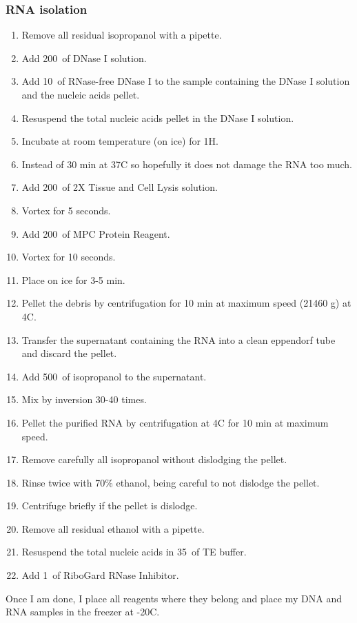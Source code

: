 \subsubsection{RNA isolation}

\begin{enumerate}
\item Remove all residual isopropanol with a pipette.
\item Add 200~\uL of DNase I solution.
\item Add 10~\uL of RNase-free DNase I to the sample containing the DNase I solution and the nucleic acids pellet.
\item Resuspend the total nucleic acids pellet in the DNase I solution.
\item Incubate at room temperature (on ice) for 1H.
\item{Instead of 30 min at 37\degree C so hopefully it does not damage the RNA too much.}
\item Add 200~\uL of 2X Tissue and Cell Lysis solution.
\item Vortex for 5 seconds.
\item Add 200~\uL of MPC Protein Reagent.
\item Vortex for 10 seconds.
\item Place on ice for 3-5 min.
\item Pellet the debris by centrifugation for 10 min at maximum speed (21460 g) at 4\degree C.
\item Transfer the supernatant containing the RNA into a clean eppendorf tube and discard the pellet.
\item Add 500~\uL of isopropanol to the supernatant.
\item Mix by inversion 30-40 times.
\item Pellet the purified RNA by centrifugation at 4\degree C for 10 min at maximum speed.
\item Remove carefully all isopropanol without dislodging the pellet.
\item Rinse twice with 70\% ethanol, being careful to not dislodge the pellet.
\item Centrifuge briefly if the pellet is dislodge.
\item Remove all residual ethanol with a pipette.
\item Resuspend the total nucleic acids in 35~\uL of TE buffer.
\item Add 1~\uL of RiboGard RNase Inhibitor.
\end{enumerate}

Once I am done, I place all reagents where they belong and place my DNA and RNA samples in the freezer at -20\degree C.



